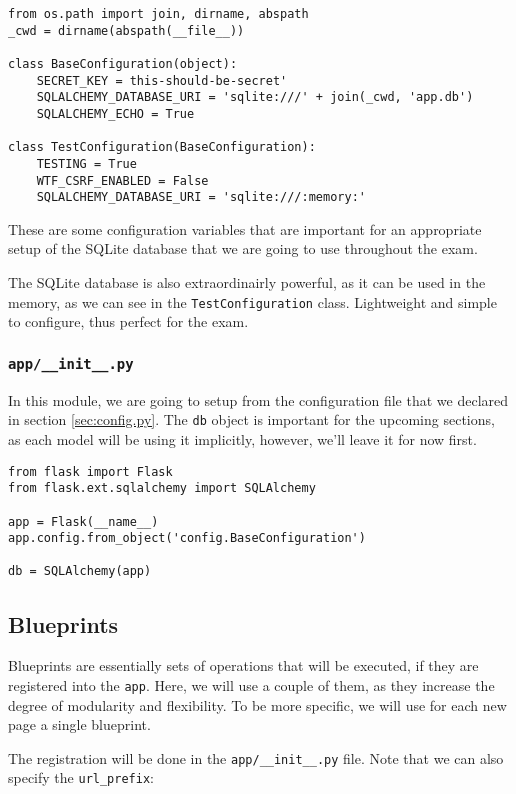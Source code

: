\documentclass[../main/main.tex]{subfiles}
\begin{document}
\begin{lstlisting}
from os.path import join, dirname, abspath
_cwd = dirname(abspath(__file__))

class BaseConfiguration(object):
    SECRET_KEY = this-should-be-secret'
    SQLALCHEMY_DATABASE_URI = 'sqlite:///' + join(_cwd, 'app.db')
    SQLALCHEMY_ECHO = True

class TestConfiguration(BaseConfiguration):
    TESTING = True
    WTF_CSRF_ENABLED = False
    SQLALCHEMY_DATABASE_URI = 'sqlite:///:memory:'
\end{lstlisting}

These are some configuration variables that are important for an
appropriate setup of the SQLite database that we are going to use
throughout the exam. 

The SQLite database is also extraordinairly powerful, as it can be
used in the memory, as we can see in the \lstinline|TestConfiguration|
class. Lightweight and simple to configure, thus perfect for the exam.

\subsubsection{\lstinline|app/__init__.py|}

In this module, we are going to setup from the configuration file that
we declared in section \ref{sec:config.py}. The \lstinline|db| object
is important for the upcoming sections, as each model will be using
it implicitly, however, we'll leave it for now first. 

\begin{lstlisting}
from flask import Flask
from flask.ext.sqlalchemy import SQLAlchemy

app = Flask(__name__)
app.config.from_object('config.BaseConfiguration')

db = SQLAlchemy(app)
\end{lstlisting}

\subsection{Blueprints}

Blueprints are essentially sets of operations that will be executed,
if they are registered into the \lstinline|app|. Here, we will use a
couple of them, as they increase the degree of modularity and
flexibility. To be more specific, we will use for each new page a
single blueprint. 

The registration will be done in the \lstinline|app/__init__.py|
file. Note that we can also specify the \lstinline|url_prefix|: 
\end{document}
